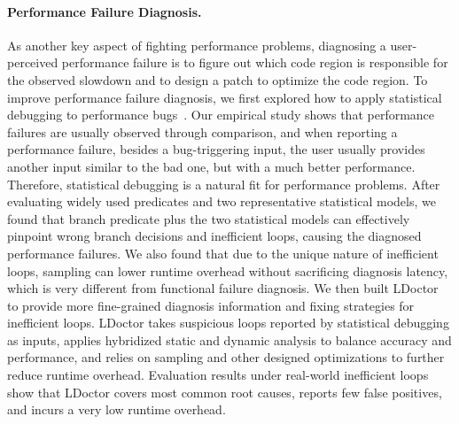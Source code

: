 \documentclass[10pt]{article}
\begin{document}
\paragraph{Performance Failure Diagnosis.}
As another key aspect of fighting performance problems,
diagnosing a user-perceived performance failure is to figure out which code 
region is responsible for the observed slowdown and 
to design a patch to optimize the code region.
To improve performance failure diagnosis, 
we first explored how to 
apply statistical debugging to performance bugs~\cite{Song14OOPSLA}. 
Our empirical study shows that performance failures are usually observed through comparison,
and when reporting a performance failure, besides a bug-triggering input, 
the user usually provides another input similar to the bad one, 
but with a much better performance.
Therefore, statistical debugging is a natural fit for performance problems. 
After evaluating widely used predicates and 
two representative statistical models, 
we found that branch predicate plus the two statistical models can effectively 
pinpoint wrong branch decisions and inefficient loops, 
causing the diagnosed performance failures. 
We also found that
due to the unique nature of inefficient loops, 
sampling can lower runtime overhead without sacrificing diagnosis latency, 
which is very different from functional failure diagnosis.
We then built LDoctor~\cite{Song17ICSE} to provide more 
fine-grained diagnosis information and fixing strategies for inefficient loops. 
LDoctor takes suspicious loops reported by 
statistical debugging as inputs, 
applies hybridized static and dynamic analysis to 
balance accuracy and performance, 
and relies on sampling and other designed optimizations 
to further reduce runtime overhead. 
Evaluation results under real-world inefficient loops 
show that LDoctor covers most common root causes, 
reports few false positives, and incurs a very low runtime overhead. 


\vspace{-.1in}
\end{document}
